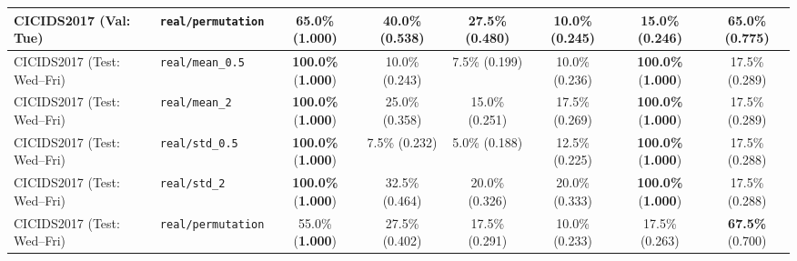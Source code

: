 \documentclass[10pt,conference]{IEEEtran}
\begin{document}
\begin{table}[!tp]
{\begin{tabular}{llcccccc}
CICIDS2017 (Val: Tue) & \texttt{real/permutation} & \textbf{65.0\%} (\textbf{1.000}) & 40.0\% (0.538) & 27.5\% (0.480) & 10.0\% (0.245) & 15.0\% (0.246) & \textbf{65.0\%} (0.775) \\
\midrule
CICIDS2017 (Test: Wed--Fri) & \texttt{real/mean\_0.5} & \textbf{100.0\%} (\textbf{1.000}) & 10.0\% (0.243) & 7.5\% (0.199) & 10.0\% (0.236) & \textbf{100.0\%} (\textbf{1.000}) & 17.5\% (0.289) \\
CICIDS2017 (Test: Wed--Fri) & \texttt{real/mean\_2} & \textbf{100.0\%} (\textbf{1.000}) & 25.0\% (0.358) & 15.0\% (0.251) & 17.5\% (0.269) & \textbf{100.0\%} (\textbf{1.000}) & 17.5\% (0.289) \\
CICIDS2017 (Test: Wed--Fri) & \texttt{real/std\_0.5} & \textbf{100.0\%} (\textbf{1.000}) & 7.5\% (0.232) & 5.0\% (0.188) & 12.5\% (0.225) & \textbf{100.0\%} (\textbf{1.000}) & 17.5\% (0.288) \\
CICIDS2017 (Test: Wed--Fri) & \texttt{real/std\_2} & \textbf{100.0\%} (\textbf{1.000}) & 32.5\% (0.464) & 20.0\% (0.326) & 20.0\% (0.333) & \textbf{100.0\%} (\textbf{1.000}) & 17.5\% (0.288) \\
CICIDS2017 (Test: Wed--Fri) & \texttt{real/permutation} & 55.0\% (\textbf{1.000}) & 27.5\% (0.402) & 17.5\% (0.291) & 10.0\% (0.233) & 17.5\% (0.263) & \textbf{67.5\%} (0.700) \\
\bottomrule
\end{tabular}}
\end{table}
\end{document}
